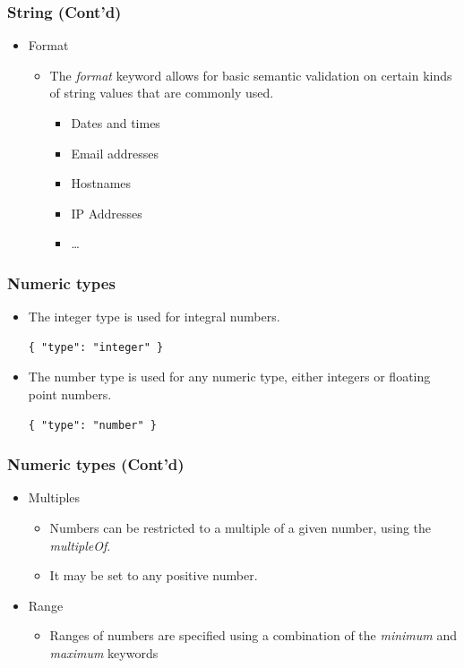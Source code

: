 \documentclass{efd-lecture}
\begin{document}
\begin{frame}
  \frametitle{String (Cont'd)}
  \begin{itemize}
    \item Format
    \begin{itemize}
      \item The \textit{\color{Cyan}format} keyword allows for basic
        semantic validation on certain kinds of string values that are
        commonly used.
      \begin{itemize}
        \item Dates and times
        \item Email addresses
        \item Hostnames
        \item IP Addresses
        \item \ldots
      \end{itemize}
    \end{itemize}
  \end{itemize}
\end{frame}

\begin{frame}[fragile]
  \frametitle{Numeric types}
  \begin{itemize}
    \item The integer type is used for integral numbers.
    \begin{verbatim}
{ "type": "integer" }
    \end{verbatim}
    \item
      The number type is used for any numeric type, either integers or
      floating point numbers.

    \begin{verbatim}
{ "type": "number" }
    \end{verbatim}
  \end{itemize}
\end{frame}

\begin{frame}
  \frametitle{Numeric types (Cont'd)}
  \begin{itemize}
    \item Multiples
    \begin{itemize}
      \item
        Numbers can be restricted to a multiple of a given number, using the
        \textit{\color{YellowOrange}multipleOf}.

      \item It may be set to any positive number.
    \end{itemize}
    \item Range
    \begin{itemize}
      \item
        Ranges of numbers are specified using a combination of the
        \textit{\color{YellowOrange}minimum} and
        \textit{\color{YellowOrange}maximum} keywords

    \end{itemize}
  \end{itemize}
\end{frame}
\end{document}

